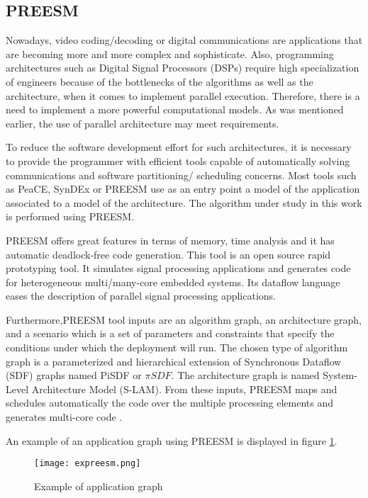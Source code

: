    \subsection{PREESM} 
      
Nowadays, video coding/decoding or digital communications are applications that are becoming more and more complex and sophisticate. Also, programming architectures such as Digital Signal Processors (DSPs) require high specialization of engineers because of the bottlenecks of the algorithms as well as the architecture, when it comes to implement parallel execution. Therefore, there is a need to implement a more powerful computational models. As was mentioned earlier, the use of parallel architecture may meet requirements.

	To reduce the software development effort for such architectures, it is necessary to provide the programmer with efficient tools capable of automatically solving communications and software partitioning/ scheduling concerns. Most tools such as PeaCE, SynDEx or PREESM use as an entry point a model of the application associated to a model of the architecture\cite{piat2010loop}. The algorithm under study in this work is performed using PREESM.

	PREESM offers great features in terms of memory, time analysis and it has automatic deadlock-free code generation. This tool is an open source rapid prototyping tool. It simulates signal processing applications and generates code for heterogeneous multi/many-core embedded systems. Its dataflow language eases the description of parallel signal processing applications.
	
	Furthermore,PREESM tool inputs are an algorithm graph, an architecture graph, and a scenario which is a set of parameters and constraints that specify the conditions under which the deployment will run. The chosen type of algorithm graph is a parameterized and hierarchical extension of Synchronous Dataflow (SDF) graphs named PiSDF or $\pi SDF$. The architecture graph is named System-Level Architecture Model (S-LAM). From these inputs, PREESM maps and schedules automatically the code over the multiple processing elements and generates multi-core code \cite{pelcat2014preesm}.
	
	
	
	An example of an application graph using PREESM is displayed in figure \ref{fig:graph}.
	
	\begin{figure}[H]
        \texttt{[image: expreesm.png]}        
        \centering    
        \caption{Example of application graph \cite{PREESM:2019:Online}}
        \label{fig:graph}
    \end{figure}
	
